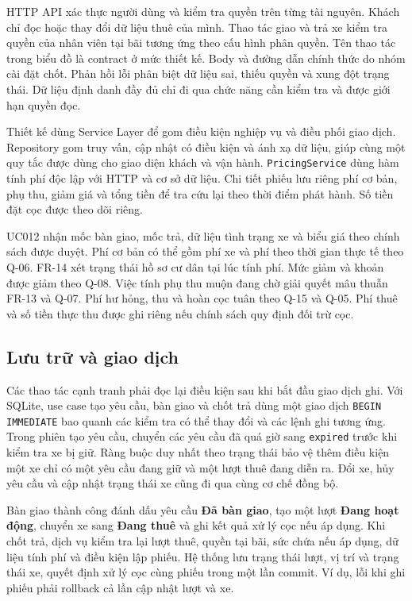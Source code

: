 HTTP API xác thực người dùng và kiểm tra quyền trên từng tài nguyên. Khách chỉ đọc hoặc thay đổi dữ liệu thuê của mình. Thao tác giao và trả xe kiểm tra quyền của nhân viên tại bãi tương ứng theo cấu hình phân quyền. Tên thao tác trong biểu đồ là contract ở mức thiết kế. Body và đường dẫn chính thức do nhóm cài đặt chốt. Phản hồi lỗi phân biệt dữ liệu sai, thiếu quyền và xung đột trạng thái. Dữ liệu định danh đầy đủ chỉ đi qua chức năng cần kiểm tra và được giới hạn quyền đọc.

Thiết kế dùng Service Layer để gom điều kiện nghiệp vụ và điều phối giao dịch. Repository gom truy vấn, cập nhật có điều kiện và ánh xạ dữ liệu, giúp cùng một quy tắc được dùng cho giao diện khách và vận hành. \texttt{PricingService} dùng hàm tính phí độc lập với HTTP và cơ sở dữ liệu. Chi tiết phiếu lưu riêng phí cơ bản, phụ thu, giảm giá và tổng tiền để tra cứu lại theo thời điểm phát hành. Số tiền đặt cọc được theo dõi riêng.

UC012 nhận mốc bàn giao, mốc trả, dữ liệu tình trạng xe và biểu giá theo chính sách được duyệt. Phí cơ bản có thể gồm phí xe và phí theo thời gian thực tế theo Q-06. FR-14 xét trạng thái hồ sơ cư dân tại lúc tính phí. Mức giảm và khoản được giảm theo Q-08. Việc tính phụ thu muộn đang chờ giải quyết mâu thuẫn FR-13 và Q-07. Phí hư hỏng, thu và hoàn cọc tuân theo Q-15 và Q-05. Phí thuê và số tiền thực thu được ghi riêng nếu chính sách quy định đối trừ cọc.

\subsection{Lưu trữ và giao dịch}

Các thao tác cạnh tranh phải đọc lại điều kiện sau khi bắt đầu giao dịch ghi. Với SQLite, use case tạo yêu cầu, bàn giao và chốt trả dùng một giao dịch \texttt{BEGIN IMMEDIATE} bao quanh các kiểm tra có thể thay đổi và các lệnh ghi tương ứng. Trong phiên tạo yêu cầu, chuyển các yêu cầu đã quá giờ sang \texttt{expired} trước khi kiểm tra xe bị giữ. Ràng buộc duy nhất theo trạng thái bảo vệ thêm điều kiện một xe chỉ có một yêu cầu đang giữ và một lượt thuê đang diễn ra. Đổi xe, hủy yêu cầu và cập nhật trạng thái xe cũng đi qua cùng cơ chế đồng bộ.

Bàn giao thành công đánh dấu yêu cầu \textbf{Đã bàn giao}, tạo một lượt \textbf{Đang hoạt động}, chuyển xe sang \textbf{Đang thuê} và ghi kết quả xử lý cọc nếu áp dụng. Khi chốt trả, dịch vụ kiểm tra lại lượt thuê, quyền tại bãi, sức chứa nếu áp dụng, dữ liệu tính phí và điều kiện lập phiếu. Hệ thống lưu trạng thái lượt, vị trí và trạng thái xe, quyết định xử lý cọc cùng phiếu trong một lần commit. Ví dụ, lỗi khi ghi phiếu phải rollback cả lần cập nhật lượt và xe.

